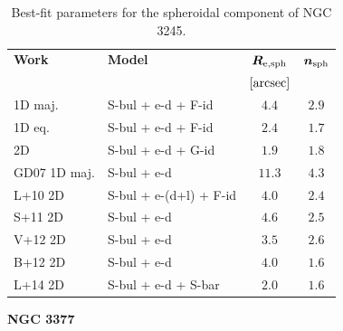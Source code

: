 \documentclass[preprint2]{emulateapj}
\begin{document}
  \begin{table}[h]
  \small
  \caption{Best-fit parameters for the spheroidal component of NGC 3245.}
  \begin{center}
  \begin{tabular}{llcc}
  \hline
  {\bf Work} & {\bf Model}   & $\bm R_{\rm e,sph}$    & $\bm n_{\rm sph}$ \\
    &  &  $[\rm arcsec]$ & \\
  \hline
  1D maj. & S-bul + e-d + F-id & $4.4$  &  $2.9$ \\
  1D eq.  & S-bul + e-d + F-id & $2.4$  &  $1.7$ \\
  2D      & S-bul + e-d + G-id & $1.9$  &  $1.8$ \\
  \hline
  GD07 1D maj.         & S-bul + e-d		& $11.3$ &  $4.3$ \\
  L+10 2D         & S-bul + e-(d+l) + F-id & $4.0$  &  $2.4$ \\
  S+11 2D         & S-bul + e-d		& $4.6$  &  $2.5$ \\
  V+12 2D         & S-bul + e-d		& $3.5$  &  $2.6$ \\
  B+12 2D         & S-bul + e-d		& $4.0$  &  $1.6$ \\
  L+14 2D         & S-bul + e-d + S-bar	& $2.0$  &  $1.6$ \\
  \hline
  \end{tabular}
  \end{center}
  \label{tab:n3245}
  \end{table}


  \clearpage\newpage\noindent

  {\bf NGC 3377 \\}
\end{document}
